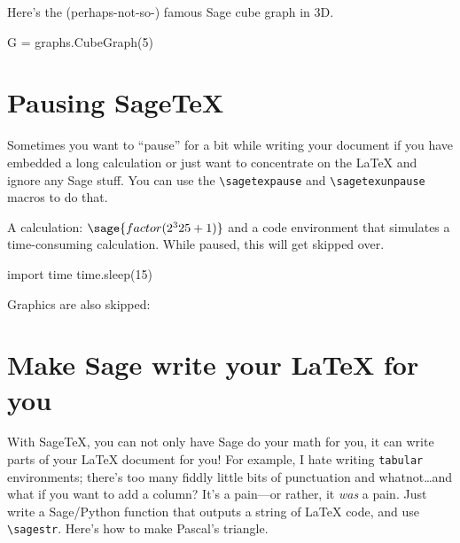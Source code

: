 \documentclass{article}
\begin{document}
Here's the (perhaps-not-so-) famous Sage cube graph in 3D.

\begin{sageblock}
  G = graphs.CubeGraph(5)
\end{sageblock}


\section{Pausing Sage\TeX}
\label{sec:pausing-sagetex}

Sometimes you want to ``pause'' for a bit while writing your document if
you have embedded a long calculation or just want to concentrate on the
\LaTeX{} and ignore any Sage stuff. You can use the \verb|\sagetexpause|
and \verb|\sagetexunpause| macros to do that.

\sagetexpause

A calculation: $\sage{factor(2^325 + 1)}$ and a code environment that
simulates a time-consuming calculation. While paused, this will get
skipped over.
\begin{sageblock}
  import time
  time.sleep(15)
\end{sageblock}

Graphics are also skipped: 

\sagetexunpause

\section{Make Sage write your \LaTeX{} for you}

With \textsf{Sage\TeX}, you can not only have Sage do your math for you,
it can write parts of your \LaTeX{} document for you! For example, I
hate writing \texttt{tabular} environments; there's too many fiddly
little bits of punctuation and whatnot\ldots and what if you want to add
a column? It's a pain---or rather, it \emph{was} a pain. Just write a
Sage/Python function that outputs a string of \LaTeX{} code, and use
\verb|\sagestr|. Here's how to make Pascal's triangle.
\end{document}

